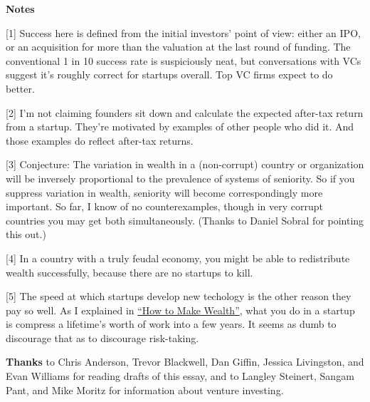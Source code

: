 \textbf{Notes}

{[}1{]} Success here is defined from the initial investors' point of
view: either an IPO, or an acquisition for more than the valuation at
the last round of funding. The conventional 1 in 10 success rate is
suspiciously neat, but conversations with VCs suggest it's roughly
correct for startups overall. Top VC firms expect to do better.

{[}2{]} I'm not claiming founders sit down and calculate the expected
after-tax return from a startup. They're motivated by examples of other
people who did it. And those examples do reflect after-tax returns.

{[}3{]} Conjecture: The variation in wealth in a (non-corrupt) country
or organization will be inversely proportional to the prevalence of
systems of seniority. So if you suppress variation in wealth, seniority
will become correspondingly more important. So far, I know of no
counterexamples, though in very corrupt countries you may get both
simultaneously. (Thanks to Daniel Sobral for pointing this out.)

{[}4{]} In a country with a truly feudal economy, you might be able to
redistribute wealth successfully, because there are no startups to kill.

{[}5{]} The speed at which startups develop new techology is the other
reason they pay so well. As I explained in \href{wealth.html}{``How to
Make Wealth''}, what you do in a startup is compress a lifetime's worth
of work into a few years. It seems as dumb to discourage that as to
discourage risk-taking.

\textbf{Thanks} to Chris Anderson, Trevor Blackwell, Dan Giffin, Jessica
Livingston, and Evan Williams for reading drafts of this essay, and to
Langley Steinert, Sangam Pant, and Mike Moritz for information about
venture investing.
